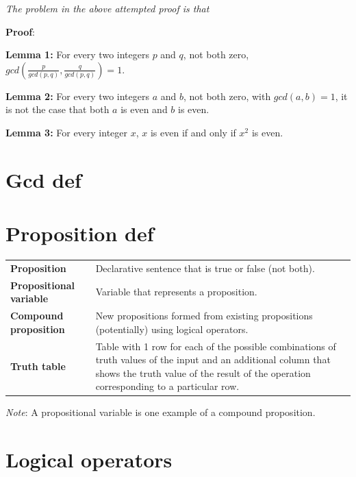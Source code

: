 \documentclass[12pt, oneside]{article}
\begin{document}
{\it The problem in the above attempted proof is that} \underline{\phantom{it only considers one candidate witness
and does not prove that no witnesses exist.}}


{\bf Proof}: 

\vfill

\vfill



{\bf Lemma 1:} For every two integers $p$  and  $q$, not both zero, $gcd\left( \frac{p}{gcd(p,q) },  \frac{q}{gcd(p,q)} \right) =  1$.


{\bf Lemma 2:} For every two integers $a$ and  $b$, not both zero, with  $gcd(a,b) = 1$, it is not the case that both $a$
is  even and $b$ is even.


{\bf Lemma 3:} For every integer  $x$, $x$ is  even if and only if $x^2$  is even.

\vfill \vfill
\section*{Gcd def}


 \vfill
\section*{Proposition def}


\begin{tabular}{lp{5in}}
    {\bf Proposition} & Declarative sentence that is true or false (not both).\\
    {\bf Propositional variable} & Variable that represents a proposition.\\
    {\bf Compound proposition}& New propositions formed from existing propositions (potentially) using logical operators.\\
    {\bf Truth table}& Table with 1 row for each of the possible combinations of truth values of the input and 
    an additional column that shows the truth value of the result of the operation corresponding to a particular row.
    \end{tabular}
    
    {\it Note}: A propositional variable is one example of a compound proposition. \vfill
\section*{Logical operators}
\end{document}
